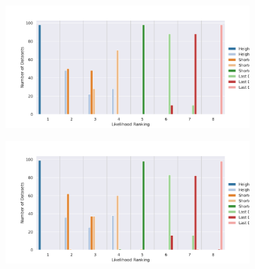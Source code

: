 \documentclass[10pt,letterpaper]{article}
\begin{document}
\begin{figure}[h!]
	\caption{This figure shows how often a specific method ranks at a certain position when compared to the other methods. For example, the height ratio embedding with the beta distribution ranked first for almost all datasets. (The lower the rank the better.)}
	
	\centering
	\begin{subfigure}[b]{0.45\textwidth}
		\centering
		\includegraphics[width=\textwidth]{figures/yule-100-ccd1-likelihood-ranking.png}
	\end{subfigure}
	\begin{subfigure}[b]{0.45\textwidth}
		\centering
		\includegraphics[width=\textwidth]{figures/yule-200-ccd1-likelihood-ranking.png}
	\end{subfigure}
	

\end{figure}
\end{document}
